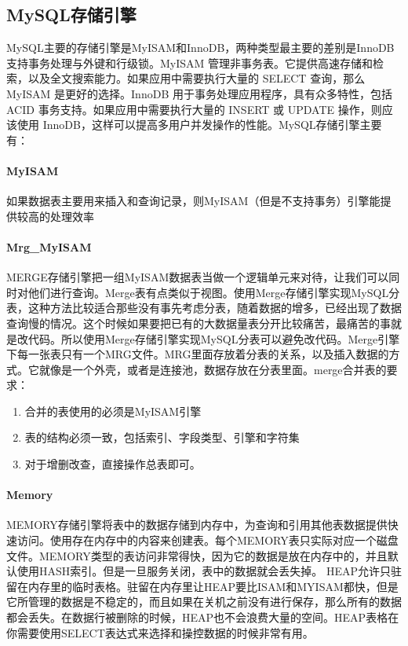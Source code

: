 \documentclass[../../../interview-questions.tex]{subfiles}
\begin{document}
\subsection{MySQL存储引擎}

MySQL主要的存储引擎是MyISAM和InnoDB，两种类型最主要的差别是InnoDB支持事务处理与外键和行级锁。MyISAM 管理非事务表。它提供高速存储和检索，以及全文搜索能力。如果应用中需要执行大量的 SELECT 查询，那么 MyISAM 是更好的选择。InnoDB 用于事务处理应用程序，具有众多特性，包括 ACID 事务支持。如果应用中需要执行大量的 INSERT 或 UPDATE 操作，则应该使用 InnoDB，这样可以提高多用户并发操作的性能。MySQL存储引擎主要有： \paragraph{MyISAM} 

如果数据表主要用来插入和查询记录，则MyISAM（但是不支持事务）引擎能提供较高的处理效率

\paragraph{Mrg\_MyISAM} 

MERGE存储引擎把一组MyISAM数据表当做一个逻辑单元来对待，让我们可以同时对他们进行查询。Merge表有点类似于视图。使用Merge存储引擎实现MySQL分表，这种方法比较适合那些没有事先考虑分表，随着数据的增多，已经出现了数据查询慢的情况。这个时候如果要把已有的大数据量表分开比较痛苦，最痛苦的事就是改代码。所以使用Merge存储引擎实现MySQL分表可以避免改代码。Merge引擎下每一张表只有一个MRG文件。MRG里面存放着分表的关系，以及插入数据的方式。它就像是一个外壳，或者是连接池，数据存放在分表里面。merge合并表的要求：

\begin{enumerate}
\item{合并的表使用的必须是MyISAM引擎}
\item{表的结构必须一致，包括索引、字段类型、引擎和字符集}
\item{对于增删改查，直接操作总表即可。}
\end{enumerate}

\paragraph{Memory}

MEMORY存储引擎将表中的数据存储到内存中，为查询和引用其他表数据提供快速访问。使用存在内存中的内容来创建表。每个MEMORY表只实际对应一个磁盘文件。MEMORY类型的表访问非常得快，因为它的数据是放在内存中的，并且默认使用HASH索引。但是一旦服务关闭，表中的数据就会丢失掉。 HEAP允许只驻留在内存里的临时表格。驻留在内存里让HEAP要比ISAM和MYISAM都快，但是它所管理的数据是不稳定的，而且如果在关机之前没有进行保存，那么所有的数据都会丢失。在数据行被删除的时候，HEAP也不会浪费大量的空间。HEAP表格在你需要使用SELECT表达式来选择和操控数据的时候非常有用。
\end{document}
